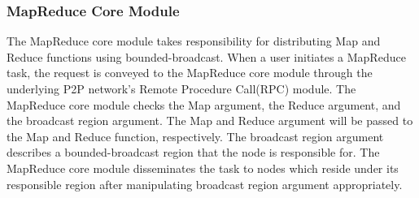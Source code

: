 \documentclass{acm_proc_article-sp}
\begin{document}
\subsubsection{MapReduce Core Module}
The MapReduce core module takes responsibility for distributing Map and Reduce functions using bounded-broadcast. 
When a user initiates a MapReduce task, the request is conveyed to the MapReduce core module through the underlying P2P network's Remote Procedure Call(RPC) module. 
The MapReduce core module checks the Map argument, the Reduce argument, and the broadcast region argument. 
The Map and Reduce argument will be passed to the Map and Reduce function, respectively. 
The broadcast region argument describes a bounded-broadcast region that the node is responsible for. 
The MapReduce core module disseminates the task to nodes which reside under its responsible region after manipulating broadcast region argument appropriately.
\end{document}
